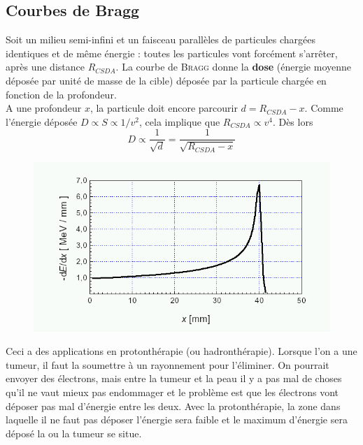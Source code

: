 \subsection{Courbes de Bragg}
Soit un milieu semi-infini et un faisceau parallèles de particules chargées identiques et de même
énergie : toutes les particules vont forcément s'arrêter, après une distance $R_{CSDA}$. La 
courbe de \textsc{Bragg} donne la \textbf{dose} (énergie moyenne déposée par unité de masse de la
cible) déposée par la particule chargée en fonction de la profondeur. \\

A une profondeur $x$, la particule doit encore parcourir $d=R_{CSDA}-x$. Comme l'énergie déposée
$D \propto S \propto 1/v^2$, cela implique que $R_{CSDA}\propto v^4$. Dès lors
\begin{equation}
D\propto \frac{1}{\sqrt d}=\frac{1}{\sqrt{R_{CSDA}-x}}
\end{equation}

	\begin{figure}
	\vspace{-7mm}
	\includegraphics[scale=0.5]{ch2/image9.png}
	\end{figure}
Ceci a des applications en protonthérapie (ou hadronthérapie). Lorsque l'on a une tumeur, il faut
la soumettre à un rayonnement pour l'éliminer. On pourrait envoyer des électrons, mais entre la 
tumeur et la peau il y a pas mal de choses qu'il ne vaut mieux pas endommager et le problème est que 
les électrons vont déposer pas mal d'énergie entre les deux. Avec la protonthérapie, la zone dans 
laquelle il ne faut pas déposer l'énergie sera faible et le maximum d'énergie sera déposé la ou 
la tumeur se situe.\\

